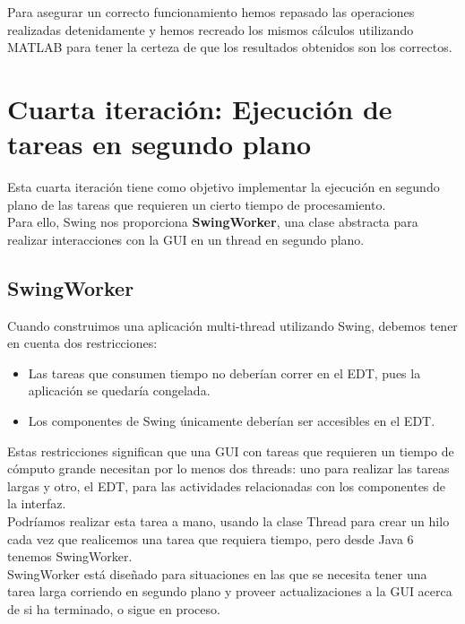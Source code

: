 \documentclass[12pt, a4paper]{book}
\begin{document}
Para asegurar un correcto funcionamiento hemos repasado las operaciones realizadas detenidamente y hemos recreado los mismos cálculos utilizando MATLAB para tener la certeza de que los resultados obtenidos son los correctos.

\newpage

\section{Cuarta iteración: Ejecución de tareas en segundo plano}

Esta cuarta iteración tiene como objetivo implementar la ejecución en segundo plano de las tareas que requieren un cierto tiempo de procesamiento.\\

Para ello, Swing nos proporciona \textbf{SwingWorker}, una clase abstracta para realizar interacciones con la \gls{GUI} en un thread en segundo plano.

\subsection{SwingWorker}

Cuando construimos una aplicación multi-thread utilizando Swing, debemos tener en cuenta dos restricciones:

\begin{itemize}
	\item Las tareas que consumen tiempo no deberían correr en el \gls{EDT}, pues la aplicación se quedaría congelada.
	\item Los componentes de Swing únicamente deberían ser accesibles en el \gls{EDT}.
\end{itemize}

Estas restricciones significan que una \gls{GUI} con tareas que requieren un tiempo de cómputo grande necesitan por lo menos dos threads: uno para realizar las tareas largas y otro, el \gls{EDT}, para las actividades relacionadas con los componentes de la interfaz.\\

Podríamos realizar esta tarea a mano, usando la clase Thread para crear un hilo cada vez que realicemos una tarea que requiera tiempo, pero desde Java 6 tenemos SwingWorker.\\

SwingWorker está diseñado para situaciones en las que se necesita tener una tarea larga corriendo en segundo plano y proveer actualizaciones a la \gls{GUI} acerca de si ha terminado, o sigue en proceso.\\
\end{document}
